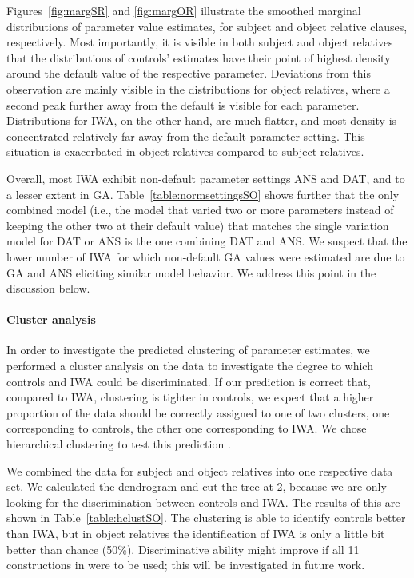 \documentclass{cambridge7A}\usepackage[]{graphicx}\usepackage[]{color}
\begin{document}
Figures~\ref{fig:margSR} and \ref{fig:margOR} illustrate the smoothed marginal distributions of parameter value estimates, for subject and object relative clauses, respectively. Most importantly, it is visible in both subject and object relatives that the distributions of controls' estimates have their point of highest density around the default value of the respective parameter. Deviations from this observation are mainly visible in the distributions for object relatives, where a second peak further away from the default is visible for each parameter. Distributions for IWA, on the other hand, are much flatter, and most density is concentrated relatively far away from the default parameter setting. This situation is exacerbated in object relatives compared to subject relatives.

Overall, most IWA exhibit non-default parameter settings ANS and DAT, and to a lesser extent in GA. Table~\ref{table:normsettingsSO} shows further that the only combined model (i.e., the model that varied two or more parameters instead of keeping the other two at their default value) that matches the single variation model for DAT or ANS is the one combining DAT and ANS. We suspect that the lower number of IWA for which non-default GA values were estimated are due to GA and ANS eliciting similar model behavior.
We address this point in the discussion below.

\paragraph{Cluster analysis} In order to investigate the
 predicted clustering of parameter estimates, we performed a  cluster analysis on the data to investigate the degree to which controls and IWA could be discriminated.
If our prediction is correct that, compared to IWA, clustering is tighter in controls, we expect that a higher proportion of the data should be correctly assigned to one of two clusters, one corresponding to controls, the other one corresponding to IWA. We chose hierarchical clustering to test this prediction \citep{friedman2001elements}.

We combined the data for subject and object relatives into one respective data set.
We calculated the dendrogram and cut the tree at 2, because we are only looking for the discrimination between controls and IWA. The results of this are shown in Table~\ref{table:hclustSO}. The clustering is able to identify controls better than IWA, but in object relatives the identification of IWA is only a little bit better than chance (50\%). 
Discriminative ability might improve if all 11 constructions in \cite{CaplanEtAl2015} were to be used; this will be investigated in future work.
\end{document}
